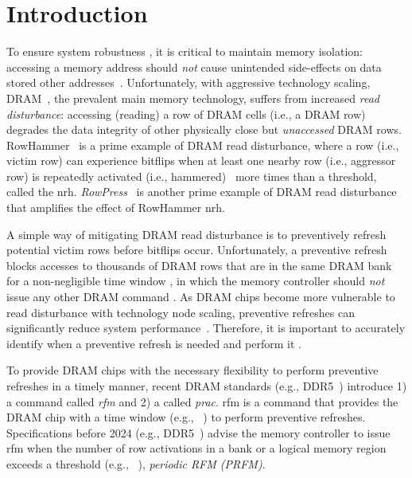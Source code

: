 \section{Introduction}
\label{sec:intro}

To ensure system robustness , it is critical to maintain memory isolation: accessing a memory address should \emph{not} cause unintended side-effects on data stored  other addresses~\cite{kim2014flipping}.
Unfortunately, with aggressive technology scaling, DRAM~\cite{dennard1968fieldeffect}, the prevalent main memory technology, suffers from increased \emph{read disturbance}: accessing (reading) a row of DRAM cells (i.e., a DRAM row) degrades the data integrity of other physically close but \emph{unaccessed} DRAM rows.\noCiteHardwareBasedMitigations{}\noCiteMcBasedRowHammerMitigations{}
RowHammer~\cite{kim2014flipping} is a prime example of DRAM read disturbance, where a row (i.e., victim row) can experience bitflips when at least one nearby row (i.e., aggressor row) is repeatedly activated (i.e., hammered)~\rhmemisolationrefs{} more times than a threshold, called the \gls{nrh}.
\emph{RowPress}~\cite{luo2023rowpress} is another prime example of DRAM read disturbance that amplifies the effect of RowHammer  \gls{nrh}.

A simple way of mitigating DRAM read disturbance is to preventively refresh potential victim rows before bitflips occur.
Unfortunately, a preventive refresh blocks accesses to thousands of DRAM rows that are in the same DRAM bank for a non-negligible time window , in which the memory controller should \emph{not} issue any other DRAM command .
As DRAM chips become more vulnerable to read disturbance with technology node scaling, preventive refreshes can significantly reduce system performance~. Therefore, it is important to accurately identify when a preventive refresh is needed and perform it .

To provide DRAM chips with the necessary flexibility to perform preventive refreshes in a timely manner, recent DRAM standards (e.g., DDR5~\cite{jedec2020jesd795, jedec2024jesd795c}) introduce 1) a command called \emph{\gls{rfm}}\cite{jedec2020jesd795} and 2) a  called \emph{\gls{prac}}\cite{jedec2024jesd795c}.
\gls{rfm} is a command that provides the DRAM chip with a time window (e.g., ~\cite{jedec2024jesd795c}) to perform preventive refreshes.
Specifications before 2024 (e.g.,  DDR5~\cite{jedec2020jesd795}) advise the memory controller to issue \gls{rfm} when the number of row activations in a bank or a logical memory region exceeds a threshold (e.g., ~\cite{jedec2024jesd795c}),  \emph{periodic RFM (PRFM)}.

